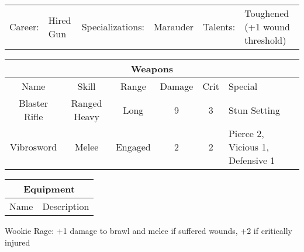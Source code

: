 \documentclass[letterpaper]{article}
\begin{document}
\begin{center}
\begin{tabularx}{0.8\textwidth}{l l | l l | l X}
    Career: & Hired Gun & Specializations: & Marauder & Talents: & Toughened (+1 wound threshold)
\end{tabularx}
\end{center}

\begin{center}
\begin{tabularx}{0.8\textwidth}{| c | c | c | c | c | X |}
    \multicolumn{6}{c}{Weapons} \\ \hline
    Name & Skill & Range & Damage & Crit & Special \\ \hline
    Blaster Rifle & Ranged Heavy & Long & 9 & 3 & Stun Setting \\
    Vibrosword & Melee & Engaged & 2 & 2 & Pierce 2, Vicious 1, Defensive 1 \\
    \hline
\end{tabularx}
\end{center}

\begin{center}
\begin{tabularx}{0.8\textwidth}{| c | X |}
    \multicolumn{2}{c}{Equipment} \\ \hline
    Name & Description \\ \hline
    \hline
\end{tabularx}
\end{center}

\begin{center}
    Wookie Rage: +1 damage to brawl and melee if suffered wounds, +2 if critically injured
\end{center}
\end{document}
